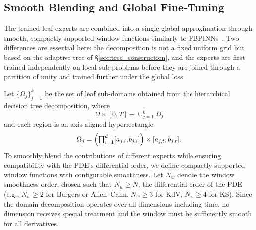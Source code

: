 \subsection{Smooth Blending and Global Fine-Tuning}
\label{sec:smoothstep_windows}

The trained leaf experts are combined into a single global approximation
through smooth, compactly supported window functions similarly to FBPINNs~\cite{moseley2021fbpinn}. Two
differences are essential here: the decomposition is not a fixed uniform grid but
based on the adaptive tree of \S\ref{sec:tree_construction}, and the experts are first 
trained independently on local sub-problems before they are joined through a partition of unity and trained further under the global loss.

Let $\{\Omega_j\}_{j=1}^{k}$ be the set of leaf sub-domains obtained from the hierarchical
decision tree decomposition, where 
\[
\Omega\times[0,T]=\cup_{j=1}^k \Omega_j
\]
and each region is an axis-aligned hyperrectangle
\[
\Omega_j = \Bigl(\textstyle\prod_{i=1}^{d} [a_{j,i}, b_{j,i}]\Bigr) \times [a_{j,t}, b_{j,t}].
\]
To smoothly blend the contributions of different experts while
ensuring compatibility with the PDE's differential order, we define compactly
supported window functions with configurable smoothness. Let $N_w$ denote the
window smoothness order, chosen such that $N_w \geq N$, the differential order
of the PDE (e.g., $N_w \geq 2$ for Burgers or Allen--Cahn, $N_w \geq 3$ for
KdV, $N_w \geq 4$ for KS). Since the domain decomposition operates over all dimensions including time, no dimension
receives special treatment and the window must be sufficiently smooth for all
derivatives.

